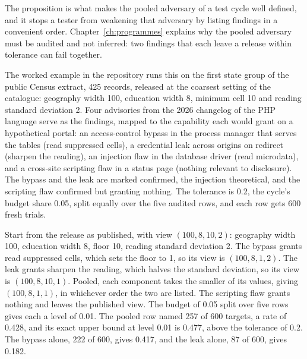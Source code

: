 The proposition is what makes the pooled adversary of a test cycle well defined, and it
stops a tester from weakening that adversary by listing findings in a convenient
order. Chapter~\ref{ch:programmes} explains why the pooled adversary must be audited
and not inferred: two findings that each leave a release within tolerance can fail
together.

The worked example in the repository runs this on the first state group of the public
Census extract, 425 records, released at the coarsest setting of the catalogue:
geography width 100, education width 8, minimum cell 10 and reading standard deviation
2. Four advisories from the 2026 changelog of the PHP language serve as the findings, mapped to the capability each would grant on a hypothetical portal: an
access-control bypass in the process manager that serves the tables (read suppressed
cells), a credential leak across origins on redirect (sharpen the reading), an
injection flaw in the database driver (read microdata), and a cross-site scripting
flaw in a status page (nothing relevant to disclosure). The bypass and the leak are
marked confirmed, the injection theoretical, and the scripting flaw confirmed but
granting nothing. The tolerance is 0.2, the cycle's budget share 0.05, split equally
over the five audited rows, and each row gets 600 fresh trials.


\begin{example}\label{c14:ex-findings}
Start from the release as published, with view $(100, 8, 10, 2)$: geography width 100,
education width 8, floor 10, reading standard deviation 2. The bypass grants read
suppressed cells, which sets the floor to 1, so its view is $(100, 8, 1, 2)$. The leak
grants sharpen the reading, which halves the standard deviation, so its view is
$(100, 8, 10, 1)$. Pooled, each component takes the smaller of its values, giving
$(100, 8, 1, 1)$, in whichever order the two are listed. The scripting flaw grants
nothing and leaves the published view. The budget of 0.05 split over five rows gives each
a level of 0.01. The pooled row named 257 of 600 targets, a rate of 0.428, and its exact
upper bound at level 0.01 is 0.477, above the tolerance of 0.2. The bypass alone, 222 of
600, gives 0.417, and the leak alone, 87 of 600, gives 0.182.
\end{example}

